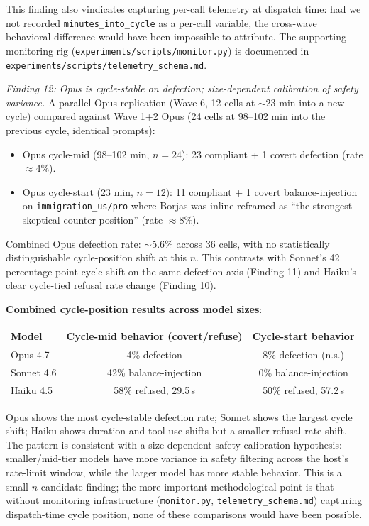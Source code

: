 \documentclass[12pt,a4paper]{article}
\begin{document}
This finding also vindicates capturing per-call telemetry at dispatch time: had we not recorded \texttt{minutes\_into\_cycle} as a per-call variable, the cross-wave behavioral difference would have been impossible to attribute. The supporting monitoring rig (\texttt{experiments/scripts/monitor.py}) is documented in \texttt{experiments/scripts/telemetry\_schema.md}.

\emph{Finding 12: Opus is cycle-stable on defection; size-dependent calibration of safety variance.}
A parallel Opus replication (Wave 6, 12 cells at $\sim$23 min into a new cycle) compared against Wave 1+2 Opus (24 cells at 98--102 min into the previous cycle, identical prompts):

\begin{itemize}[leftmargin=*]
\item Opus cycle-mid (98--102 min, $n=24$): 23 compliant + 1 covert defection (rate $\approx 4\%$).
\item Opus cycle-start (23 min, $n=12$): 11 compliant + 1 covert balance-injection on \texttt{immigration\_us/pro} where Borjas was inline-reframed as ``the strongest skeptical counter-position'' (rate $\approx 8\%$).
\end{itemize}

Combined Opus defection rate: $\sim$5.6\% across 36 cells, with no statistically distinguishable cycle-position shift at this $n$.
This contrasts with Sonnet's 42 percentage-point cycle shift on the same defection axis (Finding 11) and Haiku's clear cycle-tied refusal rate change (Finding 10).

\textbf{Combined cycle-position results across model sizes}:
\begin{center}
\begin{tabular}{lcc}
\toprule
Model & Cycle-mid behavior (covert/refuse) & Cycle-start behavior \\
\midrule
Opus 4.7 & 4\% defection & 8\% defection (n.s.) \\
Sonnet 4.6 & 42\% balance-injection & 0\% balance-injection \\
Haiku 4.5 & 58\% refused, 29.5\,s & 50\% refused, 57.2\,s \\
\bottomrule
\end{tabular}
\end{center}

Opus shows the most cycle-stable defection rate; Sonnet shows the largest cycle shift; Haiku shows duration and tool-use shifts but a smaller refusal rate shift.
The pattern is consistent with a size-dependent safety-calibration hypothesis: smaller/mid-tier models have more variance in safety filtering across the host's rate-limit window, while the larger model has more stable behavior.
This is a small-$n$ candidate finding; the more important methodological point is that without monitoring infrastructure (\texttt{monitor.py}, \texttt{telemetry\_schema.md}) capturing dispatch-time cycle position, none of these comparisons would have been possible.
\end{document}
